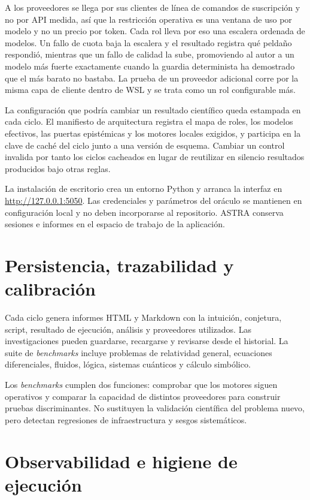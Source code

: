 \documentclass[11pt,a4paper]{article}
\begin{document}
A los proveedores se llega por sus clientes de línea de comandos de suscripción y no por API medida, así que la restricción operativa es una ventana de uso por modelo y no un precio por token. Cada rol lleva por eso una escalera ordenada de modelos. Un fallo de cuota baja la escalera y el resultado registra qué peldaño respondió, mientras que un fallo de calidad la sube, promoviendo al autor a un modelo más fuerte exactamente cuando la guardia determinista ha demostrado que el más barato no bastaba. La prueba de un proveedor adicional corre por la misma capa de cliente dentro de WSL y se trata como un rol configurable más.

La configuración que podría cambiar un resultado científico queda estampada en cada ciclo. El manifiesto de arquitectura registra el mapa de roles, los modelos efectivos, las puertas epistémicas y los motores locales exigidos, y participa en la clave de caché del ciclo junto a una versión de esquema. Cambiar un control invalida por tanto los ciclos cacheados en lugar de reutilizar en silencio resultados producidos bajo otras reglas.

La instalación de escritorio crea un entorno Python y arranca la interfaz en \url{http://127.0.0.1:5050}. Las credenciales y parámetros del oráculo se mantienen en configuración local y no deben incorporarse al repositorio. ASTRA conserva sesiones e informes en el espacio de trabajo de la aplicación.

\section{Persistencia, trazabilidad y calibración}

Cada ciclo genera informes HTML y Markdown con la intuición, conjetura, script, resultado de ejecución, análisis y proveedores utilizados. Las investigaciones pueden guardarse, recargarse y revisarse desde el historial. La suite de \textit{benchmarks} incluye problemas de relatividad general, ecuaciones diferenciales, fluidos, lógica, sistemas cuánticos y cálculo simbólico.

Los \textit{benchmarks} cumplen dos funciones: comprobar que los motores siguen operativos y comparar la capacidad de distintos proveedores para construir pruebas discriminantes. No sustituyen la validación científica del problema nuevo, pero detectan regresiones de infraestructura y sesgos sistemáticos.

\section{Observabilidad e higiene de ejecución}
\end{document}
